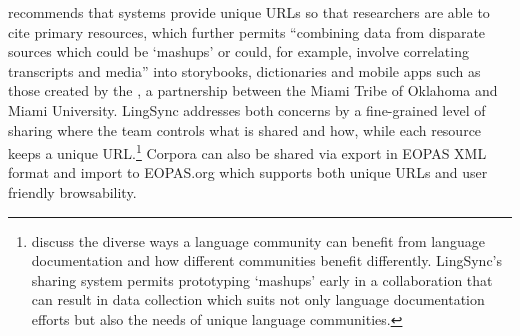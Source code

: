 \documentclass[letterpaper, 12pt, dvips]{mitwpl}
\begin{document}
\cite{Thieberger:2012}  recommends that systems provide unique URLs so that researchers are able to cite primary resources, which further permits ``combining data from disparate sources which could be `mashups' or could, for example, involve correlating transcripts and media'' into  storybooks, dictionaries  and mobile apps such as those created by the \cite{Myaamia:2001}, a partnership between the Miami Tribe of Oklahoma and Miami University. LingSync addresses both concerns by a fine-grained level of sharing where the team controls what is shared and how, while each resource keeps a unique URL.\footnote{ \cite{Musgrave:2012} discuss the diverse ways a language community can benefit from language documentation and how different communities benefit differently. LingSync's sharing system permits prototyping `mashups' early in a collaboration that can result in data collection which suits not only language documentation efforts but also the needs of  unique language communities.} 
Corpora can also be shared via export in EOPAS XML format and import to EOPAS.org which supports both unique URLs and user friendly browsability. 





%
%
\end{document}
